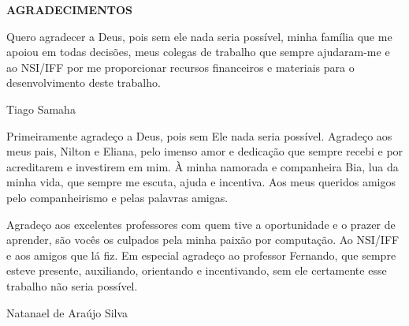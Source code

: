 \begin{center}
\textbf{AGRADECIMENTOS}
\end{center}

Quero agradecer a Deus, pois sem ele nada seria possível, minha família que me apoiou em todas decisões, meus colegas de trabalho que sempre ajudaram-me e ao NSI/IFF por me proporcionar recursos financeiros e materiais para o desenvolvimento deste trabalho.

Tiago Samaha

Primeiramente agradeço a Deus, pois sem Ele nada seria possível. Agradeço aos meus pais, Nilton e Eliana, pelo imenso amor e dedicação que sempre recebi e por acreditarem e investirem em mim. À minha namorada e companheira Bia, lua da minha vida, que sempre me escuta, ajuda e incentiva. Aos meus queridos amigos pelo companheirismo e pelas palavras amigas.

Agradeço aos excelentes professores com quem tive a oportunidade e o prazer de aprender, são vocês os culpados pela minha paixão por computação. Ao NSI/IFF e aos amigos que lá fiz. Em especial agradeço ao professor Fernando, que sempre esteve presente, auxiliando, orientando e incentivando, sem ele certamente esse trabalho não seria possível.

Natanael de Araújo Silva